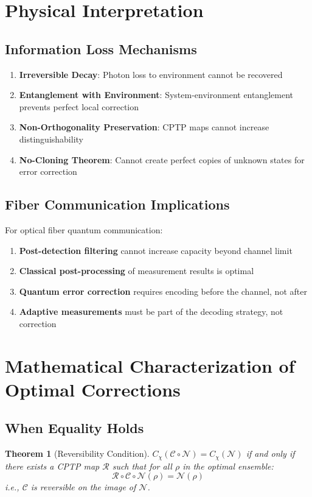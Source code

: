\documentclass[12pt]{article}
\newtheorem{theorem}{Theorem}
\begin{document}
\section{Physical Interpretation}

\subsection{Information Loss Mechanisms}
\begin{enumerate}
    \item \textbf{Irreversible Decay}: Photon loss to environment cannot be recovered
    \item \textbf{Entanglement with Environment}: System-environment entanglement prevents perfect local correction
    \item \textbf{Non-Orthogonality Preservation}: CPTP maps cannot increase distinguishability
    \item \textbf{No-Cloning Theorem}: Cannot create perfect copies of unknown states for error correction
\end{enumerate}

\subsection{Fiber Communication Implications}
For optical fiber quantum communication:
\begin{enumerate}
    \item \textbf{Post-detection filtering} cannot increase capacity beyond channel limit
    \item \textbf{Classical post-processing} of measurement results is optimal
    \item \textbf{Quantum error correction} requires encoding before the channel, not after
    \item \textbf{Adaptive measurements} must be part of the decoding strategy, not correction
\end{enumerate}

\section{Mathematical Characterization of Optimal Corrections}

\subsection{When Equality Holds}
\begin{theorem}[Reversibility Condition]
$C_{\chi}(\mathcal{C} \circ \mathcal{N}) = C_{\chi}(\mathcal{N})$ if and only if there exists a CPTP map $\mathcal{R}$ such that for all $\rho$ in the optimal ensemble:
\[
\mathcal{R} \circ \mathcal{C} \circ \mathcal{N}(\rho) = \mathcal{N}(\rho)
\]
i.e., $\mathcal{C}$ is reversible on the image of $\mathcal{N}$.
\end{theorem}
\end{document}
